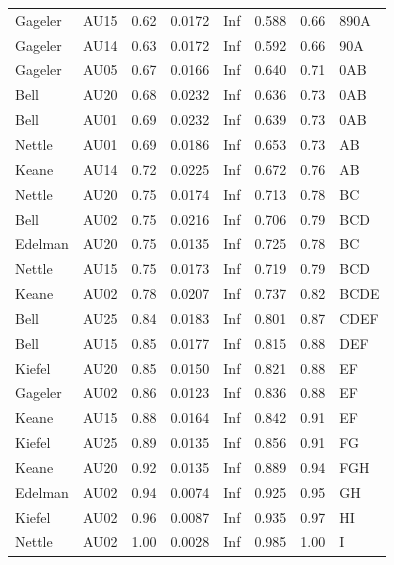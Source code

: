 \documentclass{monashthesis}
\begin{document}
\begin{table}[ht]
\begin{center}
\begin{tabular}{llllllll}
Gageler & AU15 & 0.62 & 0.0172 & Inf & 0.588 & 0.66 &         890A         \\
Gageler & AU14 & 0.63 & 0.0172 & Inf & 0.592 & 0.66 &          90A         \\
Gageler & AU05 & 0.67 & 0.0166 & Inf & 0.640 & 0.71 &           0AB        \\
Bell & AU20 & 0.68 & 0.0232 & Inf & 0.636 & 0.73 &           0AB        \\
Bell & AU01 & 0.69 & 0.0232 & Inf & 0.639 & 0.73 &           0AB        \\
Nettle & AU01 & 0.69 & 0.0186 & Inf & 0.653 & 0.73 &            AB        \\
Keane & AU14 & 0.72 & 0.0225 & Inf & 0.672 & 0.76 &            AB        \\
Nettle & AU20 & 0.75 & 0.0174 & Inf & 0.713 & 0.78 &             BC       \\
Bell & AU02 & 0.75 & 0.0216 & Inf & 0.706 & 0.79 &             BCD      \\
Edelman & AU20 & 0.75 & 0.0135 & Inf & 0.725 & 0.78 &             BC       \\
Nettle & AU15 & 0.75 & 0.0173 & Inf & 0.719 & 0.79 &             BCD      \\
Keane & AU02 & 0.78 & 0.0207 & Inf & 0.737 & 0.82 &             BCDE     \\
Bell & AU25 & 0.84 & 0.0183 & Inf & 0.801 & 0.87 &              CDEF    \\
Bell & AU15 & 0.85 & 0.0177 & Inf & 0.815 & 0.88 &               DEF    \\
Kiefel & AU20 & 0.85 & 0.0150 & Inf & 0.821 & 0.88 &                EF    \\
Gageler & AU02 & 0.86 & 0.0123 & Inf & 0.836 & 0.88 &                EF    \\
Keane & AU15 & 0.88 & 0.0164 & Inf & 0.842 & 0.91 &                EF    \\
Kiefel & AU25 & 0.89 & 0.0135 & Inf & 0.856 & 0.91 &                 FG   \\
Keane & AU20 & 0.92 & 0.0135 & Inf & 0.889 & 0.94 &                 FGH  \\
Edelman & AU02 & 0.94 & 0.0074 & Inf & 0.925 & 0.95 &                  GH  \\
Kiefel & AU02 & 0.96 & 0.0087 & Inf & 0.935 & 0.97 &                   HI \\
Nettle & AU02 & 1.00 & 0.0028 & Inf & 0.985 & 1.00 &                    I \\
\bottomrule
\end{tabular}
\end{center}
\end{table}
\end{document}
